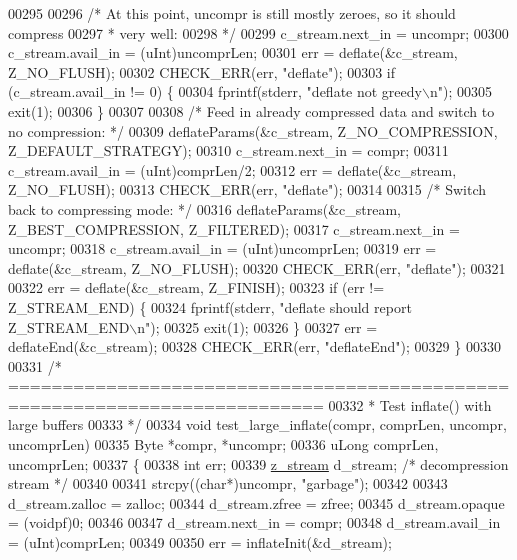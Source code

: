 \begin{DoxyCode}
{{{{{{{{{{{{00295 
00296     \textcolor{comment}{/* At this point, uncompr is still mostly zeroes, so it should compress}
00297 \textcolor{comment}{     * very well:}
00298 \textcolor{comment}{     */}
00299     c\_stream.next\_in = uncompr;
00300     c\_stream.avail\_in = (uInt)uncomprLen;
00301     err = deflate(&c\_stream, Z\_NO\_FLUSH);
00302     CHECK\_ERR(err, \textcolor{stringliteral}{"deflate"});
00303     \textcolor{keywordflow}{if} (c\_stream.avail\_in != 0) \{
00304         fprintf(stderr, \textcolor{stringliteral}{"deflate not greedy\(\backslash\)n"});
00305         exit(1);
00306     \}
00307 
00308     \textcolor{comment}{/* Feed in already compressed data and switch to no compression: */}
00309     deflateParams(&c\_stream, Z\_NO\_COMPRESSION, Z\_DEFAULT\_STRATEGY);
00310     c\_stream.next\_in = compr;
00311     c\_stream.avail\_in = (uInt)comprLen/2;
00312     err = deflate(&c\_stream, Z\_NO\_FLUSH);
00313     CHECK\_ERR(err, \textcolor{stringliteral}{"deflate"});
00314 
00315     \textcolor{comment}{/* Switch back to compressing mode: */}
00316     deflateParams(&c\_stream, Z\_BEST\_COMPRESSION, Z\_FILTERED);
00317     c\_stream.next\_in = uncompr;
00318     c\_stream.avail\_in = (uInt)uncomprLen;
00319     err = deflate(&c\_stream, Z\_NO\_FLUSH);
00320     CHECK\_ERR(err, \textcolor{stringliteral}{"deflate"});
00321 
00322     err = deflate(&c\_stream, Z\_FINISH);
00323     \textcolor{keywordflow}{if} (err != Z\_STREAM\_END) \{
00324         fprintf(stderr, \textcolor{stringliteral}{"deflate should report Z\_STREAM\_END\(\backslash\)n"});
00325         exit(1);
00326     \}
00327     err = deflateEnd(&c\_stream);
00328     CHECK\_ERR(err, \textcolor{stringliteral}{"deflateEnd"});
00329 \}
00330 
00331 \textcolor{comment}{/* ===========================================================================}
00332 \textcolor{comment}{ * Test inflate() with large buffers}
00333 \textcolor{comment}{ */}
00334 \textcolor{keywordtype}{void} test\_large\_inflate(compr, comprLen, uncompr, uncomprLen)
00335     Byte *compr, *uncompr;
00336     uLong comprLen, uncomprLen;
00337 \{
00338     \textcolor{keywordtype}{int} err;
00339     \hyperlink{structz__stream__s}{z\_stream} d\_stream; \textcolor{comment}{/* decompression stream */}
00340 
00341     strcpy((\textcolor{keywordtype}{char}*)uncompr, \textcolor{stringliteral}{"garbage"});
00342 
00343     d\_stream.zalloc = zalloc;
00344     d\_stream.zfree = zfree;
00345     d\_stream.opaque = (voidpf)0;
00346 
00347     d\_stream.next\_in  = compr;
00348     d\_stream.avail\_in = (uInt)comprLen;
00349 
00350     err = inflateInit(&d\_stream);
}}}}}}}}}}}}
\end{DoxyCode}
